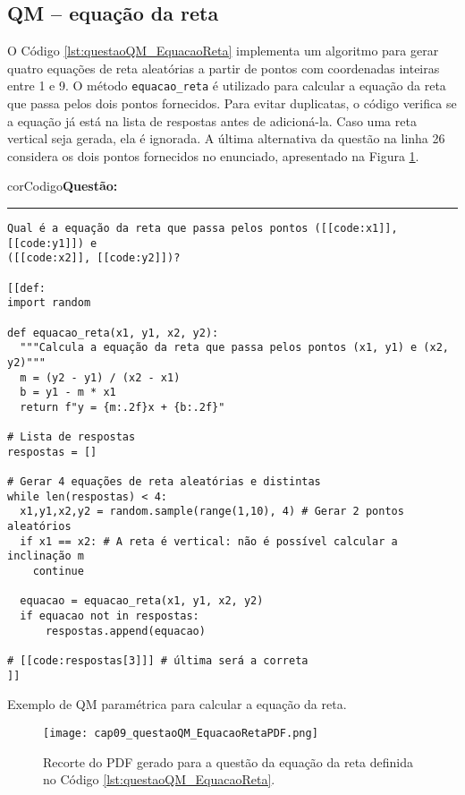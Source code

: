 \subsection{QM -- equação da reta}

O Código \ref{lst:questaoQM_EquacaoReta} implementa um algoritmo para gerar quatro equações de reta aleatórias a partir de pontos com coordenadas inteiras entre 1 e 9. O método \verb|equacao_reta| é utilizado para calcular a equação da reta que passa pelos dois pontos fornecidos. Para evitar duplicatas, o código verifica se a equação já está na lista de respostas antes de adicioná-la. Caso uma reta vertical seja gerada, ela é ignorada. A última alternativa da questão na linha 26 considera os dois pontos fornecidos no enunciado, apresentado na Figura \ref{fig:cap09_questaoQM_EquacaoRetaPDF}.

\begin{listing}[!ht]
\begin{myboxCode}{corCodigo}{\textbf{Questão: }}\vspace{3mm}
\hrule
\begin{verbatim}
Qual é a equação da reta que passa pelos pontos ([[code:x1]], [[code:y1]]) e 
([[code:x2]], [[code:y2]])?

[[def: 
import random

def equacao_reta(x1, y1, x2, y2):
  """Calcula a equação da reta que passa pelos pontos (x1, y1) e (x2, y2)"""
  m = (y2 - y1) / (x2 - x1)
  b = y1 - m * x1
  return f"y = {m:.2f}x + {b:.2f}"

# Lista de respostas
respostas = []

# Gerar 4 equações de reta aleatórias e distintas
while len(respostas) < 4:
  x1,y1,x2,y2 = random.sample(range(1,10), 4) # Gerar 2 pontos aleatórios
  if x1 == x2: # A reta é vertical: não é possível calcular a inclinação m
    continue

  equacao = equacao_reta(x1, y1, x2, y2)
  if equacao not in respostas:
      respostas.append(equacao)
        
# [[code:respostas[3]]] # última será a correta
]]
\end{verbatim}
\end{myboxCode}
\caption{Exemplo de QM paramétrica para calcular a equação da reta.}
\label{lst:questaoQM_EquacaoReta}
\end{listing}

\begin{figure}[!ht]
  \texttt{[image: cap09\_questaoQM\_EquacaoRetaPDF.png]}
  \caption{Recorte do PDF gerado para a questão da equação da reta definida no Código \ref{lst:questaoQM_EquacaoReta}.}
  \label{fig:cap09_questaoQM_EquacaoRetaPDF}
\end{figure}

